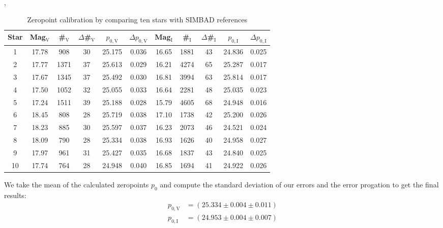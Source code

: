 	\begin{table}[H]
\setlength{\tabcolsep}{2mm}
\renewcommand{\arraystretch}{1.5}
\begin{adjustbox}{width=\textwidth, height= .26\textwidth}, 
\begin{tabular}{|c||c|c|c|c|c||c|c|c|c|c|}
\hline
Star & Mag$_{\text{V}}$ & \#$_{\text{V}}$ & $\Delta$\#$_{\text{V}}$ & $p_{0,\text{V}}$ &$\Delta p_{0,\text{V}}$ & Mag$_{\text{I}}$ & \#$_{\text{I}}$ & $\Delta$\#$_{\text{I}}$ & $p_{0,\text{I}}$ &$\Delta p_{0,\text{I}}$\\ \hline \hline
1 & 17.78 & 908 & 30 & 25.175 & 0.036 & 16.65 & 1881 & 43 & 24.836 & 0.025 \\
2 & 17.77 & 1371 & 37 & 25.613 & 0.029 & 16.21 & 4274 & 65 & 25.287 & 0.017 \\
3 & 17.67 & 1345 & 37 & 25.492 & 0.030 & 16.81 & 3994 & 63 & 25.814 & 0.017 \\
4 & 17.50 & 1052 & 32 & 25.055 & 0.033 & 16.64 & 2281 & 48 & 25.035 & 0.023 \\
5 & 17.24 & 1511 & 39 & 25.188& 0.028 & 15.79 & 4605 & 68 & 24.948 & 0.016 \\
6 & 18.45 & 808 & 28 & 25.719 & 0.038 & 17.10 & 1738 & 42 &  25.200 & 0.026 \\
7 & 18.23 & 885 & 30 & 25.597 & 0.037 & 16.23 & 2073 & 46 &  24.521 & 0.024 \\
8 & 18.09 & 790 & 28 & 25.334 & 0.038 & 16.93 & 1626 & 40 & 24.958 & 0.027 \\
9 & 17.97 & 961 & 31 & 25.427 & 0.035 & 16.68 & 1837 & 43 &  24.840 & 0.025 \\
10 & 17.74 & 764 & 28 & 24.948 & 0.040 & 16.85 &  1694 & 41 & 24.922 & 0.026 \\
\hline
\end{tabular}
\end{adjustbox}
\caption{\label{tab:2} Zeropoint calibration by comparing ten stars with SIMBAD references}
\end{table}

	
We take the mean of the calculated zeropoints $p_0$ and compute the standard deviation of our errors and the error progation to get the final results: 
\begin{align*}
	p_{0,\text{V}} &= (25.334 \pm 0.004 \pm 0.011) \\
	p_{0,\text{I}} &= (24.953 \pm 0.004 \pm 0.007)
\end{align*}